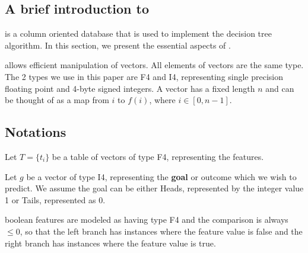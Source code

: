 \subsection{A brief introduction to }

 is a column oriented database that is used to implement the decision
tree algorithm. In this section, we present the essential aspects of .

 allows efficient manipulation of vectors. All elements of vectors are
the same type. The 2 types we use in this paper are F4 and I4, representing
single precision floating point and 4-byte signed integers. A vector has a fixed
length \(n\) and can be thought of as a map from \(i\) to \(f(i)\), 
where \(i \in [0, n-1]\).


\subsection{Notations}

\bi
\item Let \(T = \{t_i\}\) be a table of vectors of type F4, representing the features.
\item Let \(g\) be a vector of type I4, representing the {\bf goal} or 
outcome which we wish to
predict. We assume the goal can be either Heads, represented by the integer value 1 or Tails, represented as 0.
\item boolean features are
modeled as having type F4 and the comparison is always \(\leq 0\), so that the
left branch has instances where the feature value is false and the
right branch has instances where the feature value is true.
\ei


